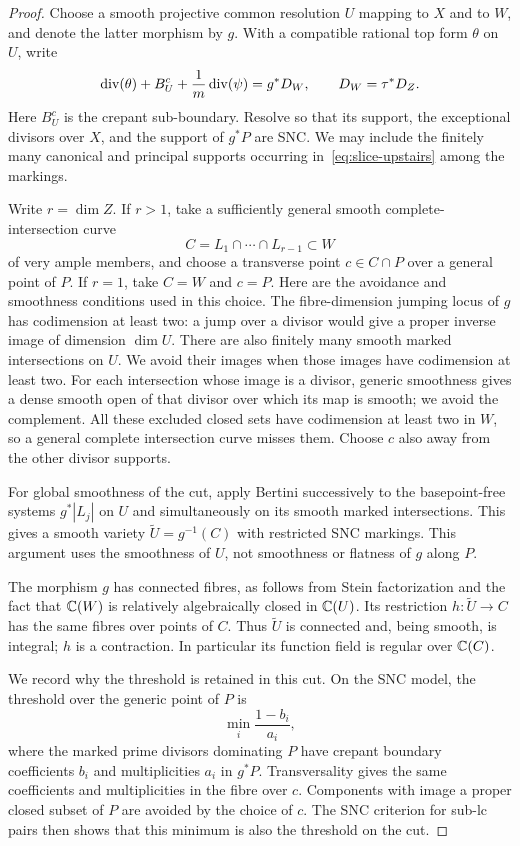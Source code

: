 \begin{proof}
Choose a smooth projective common resolution $U$ mapping to $X$ and to
$W$, and denote the latter morphism by $g$.  With a compatible rational
top form $\theta$ on $U$, write
\begin{equation}\label{eq:slice-upstairs}
 \operatorname{div}(\theta)+B_U^c+\frac1m\operatorname{div}(\psi)=g^*D_W,
 \qquad D_W=\tau^*D_Z.
\end{equation}
Here $B_U^c$ is the crepant sub-boundary.  Resolve so that its support,
the exceptional divisors over $X$, and the support of $g^*P$ are SNC.
We may include the finitely many canonical and principal supports
occurring in~\eqref{eq:slice-upstairs} among the markings.

Write $r=\dim Z$.  If $r>1$, take a sufficiently general smooth
complete-intersection curve
\[
 C=L_1\cap\cdots\cap L_{r-1}\subset W
\]
of very ample members, and choose a transverse point $c\in C\cap P$
over a general point of $P$.  If $r=1$, take $C=W$ and $c=P$.
Here are the avoidance and smoothness conditions used in this choice.
The fibre-dimension jumping locus of $g$ has codimension at least two:
a jump over a divisor would give a proper inverse image of dimension
$\dim U$.  There are also finitely many smooth marked intersections
on $U$.  We avoid their images when those images have codimension at
least two.  For each intersection whose image is a divisor, generic
smoothness gives a dense smooth open of that divisor over which its
map is smooth; we avoid the complement.  All these excluded closed
sets have codimension at least two in $W$, so a general complete
intersection curve misses them.  Choose $c$ also away from the other
divisor supports.

For global smoothness of the cut, apply Bertini successively to the
basepoint-free systems $g^*|L_j|$ on $U$ and simultaneously on its
smooth marked intersections.  This gives a smooth variety
$\widetilde U=g^{-1}(C)$ with restricted SNC markings.  This argument
uses the smoothness of $U$, not smoothness or flatness of $g$ along
$P$.

The morphism $g$ has connected fibres, as follows from Stein
factorization and the fact that $\mathbb C(W)$ is relatively algebraically
closed in $\mathbb C(U)$.  Its restriction $h:\widetilde U\to C$ has the
same fibres over points of $C$.  Thus $\widetilde U$ is connected and,
being smooth, is integral; $h$ is a contraction.  In particular its
function field is regular over $\mathbb C(C)$.

We record why the threshold is retained in this cut.  On the SNC model,
the threshold over the generic point of $P$ is
\[
 \min_i\frac{1-b_i}{a_i},
\]
where the marked prime divisors dominating $P$ have crepant boundary
coefficients $b_i$ and multiplicities $a_i$ in $g^*P$.
Transversality gives the same coefficients and multiplicities in the
fibre over $c$.  Components with image a proper closed subset of $P$
are avoided by the choice of $c$.  The SNC criterion for sub-lc pairs
then shows that this minimum is also the threshold on the cut.


\end{proof}

